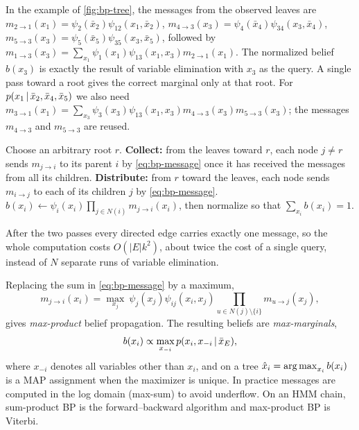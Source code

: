 In the example of \cref{fig:bp-tree}, the messages from the observed leaves are $m_{2\to1}(x_1)=\psi_2(\bar x_2)\psi_{12}(x_1,\bar x_2)$, $m_{4\to3}(x_3)=\psi_4(\bar x_4)\psi_{34}(x_3,\bar x_4)$, $m_{5\to3}(x_3)=\psi_5(\bar x_5)\psi_{35}(x_3,\bar x_5)$, followed by $m_{1\to3}(x_3)=\sum_{x_1}\psi_1(x_1)\psi_{13}(x_1,x_3)m_{2\to1}(x_1)$. The normalized belief $b(x_3)$ is exactly the result of variable elimination with $x_3$ as the query. A single pass toward a root gives the correct marginal only at that root. For $p(x_1\,|\,\bar x_2,\bar x_4,\bar x_5)$ we also need $m_{3\to1}(x_1)=\sum_{x_3}\psi_3(x_3)\psi_{13}(x_1,x_3)m_{4\to3}(x_3)m_{5\to3}(x_3)$; the messages $m_{4\to3}$ and $m_{5\to3}$ are reused.

\begin{algorithm}[H]
\caption{Belief Propagation on a Tree (Sum-Product)}\label{alg:bp}
\begin{algorithmic}[1]
\State Choose an arbitrary root $r$.
\State \textbf{Collect:} from the leaves toward $r$, each node $j\ne r$ sends $m_{j\to i}$ to its parent $i$ by \eqref{eq:bp-message} once it has received the messages from all its children.
\State \textbf{Distribute:} from $r$ toward the leaves, each node sends $m_{i\to j}$ to each of its children $j$ by \eqref{eq:bp-message}.
  \State $b(x_i)\gets\psi_i(x_i)\prod_{j\in N(i)}m_{j\to i}(x_i)$, then normalize so that $\sum_{x_i}b(x_i)=1$.
\EndFor
{}
\end{algorithmic}
\end{algorithm}

After the two passes every directed edge carries exactly one message, so the whole computation costs $O(|E|k^2)$, about twice the cost of a single query, instead of $N$ separate runs of variable elimination.

\begin{remark}\label{rem:max-product}
Replacing the sum in \eqref{eq:bp-message} by a maximum,
\[
m_{j\to i}(x_i)=\max_{x_j}\ \psi_j(x_j)\psi_{ij}(x_i,x_j)\prod_{u\in N(j)\setminus\{i\}}m_{u\to j}(x_j),
\]
gives \emph{max-product} belief propagation. The resulting beliefs are \emph{max-marginals},
\[
b(x_i)\propto\max_{x_{-i}}p(x_i,x_{-i}\,|\,\bar x_E),
\]
where $x_{-i}$ denotes all variables other than $x_i$, and on a tree $\hat x_i=\operatorname*{arg\,max}_{x_i}b(x_i)$ is a MAP assignment when the maximizer is unique. In practice messages are computed in the log domain (max-sum) to avoid underflow. On an HMM chain, sum-product BP is the forward--backward algorithm and max-product BP is Viterbi.
\end{remark}

